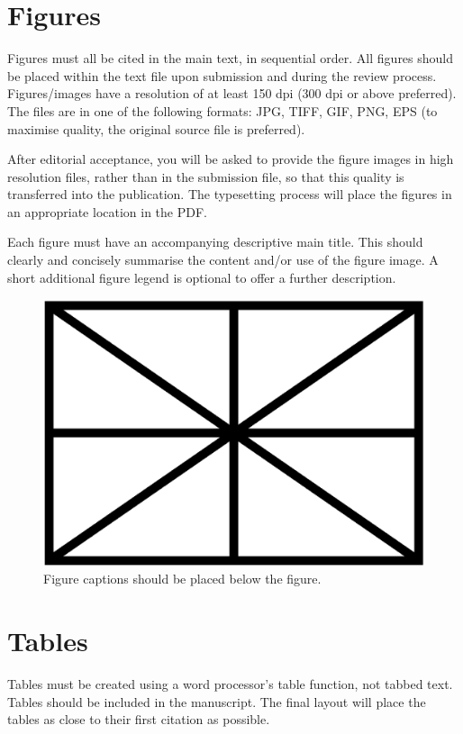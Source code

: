 \documentclass{article}
\begin{document}
\section{Figures}\label{sec:figures}

Figures must all be cited in the main text, in sequential order.
All figures should be placed within the text file upon submission and during
the review process. Figures/images have a resolution of at least 150 dpi
(300 dpi or above preferred). The files are in one of the following formats:
JPG, TIFF, GIF, PNG, EPS (to maximise quality,
the original source file is preferred).

After editorial acceptance, you will be asked to provide the figure
images in high resolution files, rather than in the submission file,
so that this quality is transferred into the publication.
The typesetting process will place the figures in an appropriate
location in the PDF.

Each figure must have an accompanying descriptive main title.
This should clearly and concisely summarise the content and/or
use of the figure image.
A short additional figure legend is optional to offer a further description.

\begin{figure}[htbp]
  \centering
  \includegraphics[width=0.9\columnwidth]{figure}
  \caption{Figure captions should be placed below the figure.}
\label{fig:figure}
\end{figure}

\section{Tables}\label{sec:tables}

Tables must be created using a word processor's table function,
not tabbed text.
Tables should be included in the manuscript.
The final layout will place the tables as close to their first
citation as possible.
\end{document}
